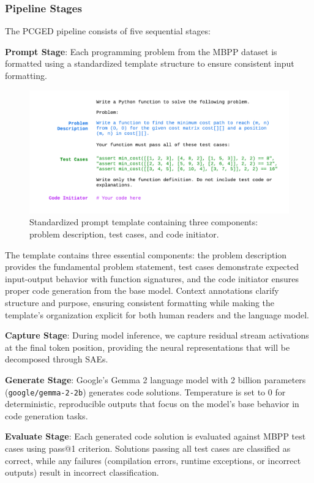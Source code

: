 \documentclass[11pt]{article}
\begin{document}
\subsubsection{Pipeline Stages}

The PCGED pipeline consists of five sequential stages:

\textbf{Prompt Stage}: Each programming problem from the MBPP dataset is formatted using a standardized template structure to ensure consistent input formatting.

\begin{figure}[!ht]
    \centering
    \includegraphics[width=1\linewidth]{figures/template.pdf}
    \caption{Standardized prompt template containing three components: problem description, test cases, and code initiator.}
    \label{fig:template}
\end{figure}

The template contains three essential components: the problem description provides the fundamental problem statement, test cases demonstrate expected input-output behavior with function signatures, and the code initiator ensures proper code generation from the base model. Context annotations clarify structure and purpose, ensuring consistent formatting while making the template's organization explicit for both human readers and the language model.

\textbf{Capture Stage}: During model inference, we capture residual stream activations at the final token position, providing the neural representations that will be decomposed through SAEs.

\textbf{Generate Stage}: Google's Gemma 2 language model with 2 billion parameters (\texttt{google/gemma-2-2b}) \citep{team2024gemma} generates code solutions. Temperature is set to 0 for deterministic, reproducible outputs that focus on the model's base behavior in code generation tasks.

\textbf{Evaluate Stage}: Each generated code solution is evaluated against MBPP test cases using pass@1 criterion. Solutions passing all test cases are classified as correct, while any failures (compilation errors, runtime exceptions, or incorrect outputs) result in incorrect classification.
\end{document}

